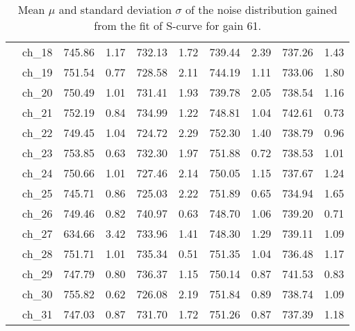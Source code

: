 \begin{table}[H]
{\begin{tabular}{|c|c|c|c|c|c|c|c|c|c|}
    &ch\_18 & 745.86 & 1.17 & 732.13 & 1.72 & 739.44 & 2.39 & 737.26 & 1.43 \\
    &ch\_19 & 751.54 & 0.77 & 728.58 & 2.11 & 744.19 & 1.11 & 733.06 & 1.80 \\
    &ch\_20 & 750.49 & 1.01 & 731.41 & 1.93 & 739.78 & 2.05 & 738.54 & 1.16 \\
    &ch\_21 & 752.19 & 0.84 & 734.99 & 1.22 & 748.81 & 1.04 & 742.61 & 0.73 \\
    &ch\_22 & 749.45 & 1.04 & 724.72 & 2.29 & 752.30 & 1.40 & 738.79 & 0.96 \\
    &ch\_23 & 753.85 & 0.63 & 732.30 & 1.97 & 751.88 & 0.72 & 738.53 & 1.01 \\
    &ch\_24 & 750.66 & 1.01 & 727.46 & 2.14 & 750.05 & 1.15 & 737.67 & 1.24 \\
    &ch\_25 & 745.71 & 0.86 & 725.03 & 2.22 & 751.89 & 0.65 & 734.94 & 1.65 \\
    &ch\_26 & 749.46 & 0.82 & 740.97 & 0.63 & 748.70 & 1.06 & 739.20 & 0.71 \\
    &ch\_27 & 634.66 & 3.42 & 733.96 & 1.41 & 748.30 & 1.29 & 739.11 & 1.09 \\
    &ch\_28 & 751.71 & 1.01 & 735.34 & 0.51 & 751.35 & 1.04 & 736.48 & 1.17 \\
    &ch\_29 & 747.79 & 0.80 & 736.37 & 1.15 & 750.14 & 0.87 & 741.53 & 0.83 \\
    &ch\_30 & 755.82 & 0.62 & 726.08 & 2.19 & 751.84 & 0.89 & 738.74 & 1.09 \\
    &ch\_31 & 747.03 & 0.87 & 731.70 & 1.72 & 751.26 & 0.87 & 737.39 & 1.18 \\
    
    \hline
     
    \end{tabular}
    }
    \caption{Mean $\mu$ and standard deviation $\sigma$ of the noise distribution gained from the fit of S-curve for gain 61.}
    \label{tab:noise_parameter_2}
\end{table}


